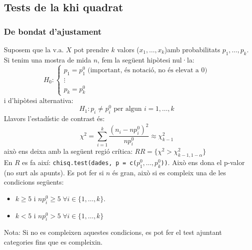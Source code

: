 \documentclass[a4paper]{sciposter}
\begin{document}
\begin{multicols}{3}
\subsection{Tests de la khi quadrat}
\subsubsection{De bondat d'ajustament}
Suposem que la v.a. $X$ pot prendre $k$ valors ($x_1, \dots, x_k$)amb probabilitats $p_1,\dots,p_k$.\\
Si tenim una mostra de mida $n$, fem la següent hipòtesi nul·la:
\begin{displaymath}
	H_0: \begin{cases} p_1 = p_1^0 \text{ (important, és notació, no és elevat a $0$)}\\ \vdots\\ p_k = p_k^0\end{cases}
\end{displaymath}
i d'hipòtesi alternativa:
\begin{displaymath}
	H_1: p_i \neq p_i^ 0 \text{ per algun } i = 1,\dots,k
\end{displaymath}
Llavors l'estadístic de contrast és:
\begin{displaymath}
	\chi^2 = \sum_{i=1}^k \frac{(n_i - np_i^0)^2}{np_i^0} \approx \chi^2_{k-1}
\end{displaymath}
això ens deixa amb la següent regió crítica:
$RR = \{\chi^2 > \chi^2_{k-1,1-\alpha}\}$\\
En $R$ es fa així: \texttt{chisq.test(dades, p = c($p_1^0,\dots,p_k^0$))}. Això ens dona el p-valor (no surt als apunts).
Es pot fer si $n$ és gran, això si es compleix una de les condicions següents:
\begin{itemize}
	\item $k \geq 5$ i $np_i^0 \geq 5 \;\forall i \in \{1,\dots,k\}$.
	\item $k < 5$ i $np_i^0 > 5 \;\forall i \in \{1,\dots,k\}$
\end{itemize}
Nota: Si no es compleixen aquestes condicions, es pot fer el test ajuntant categories fins que es compleixin.

\end{multicols}
\end{document}
